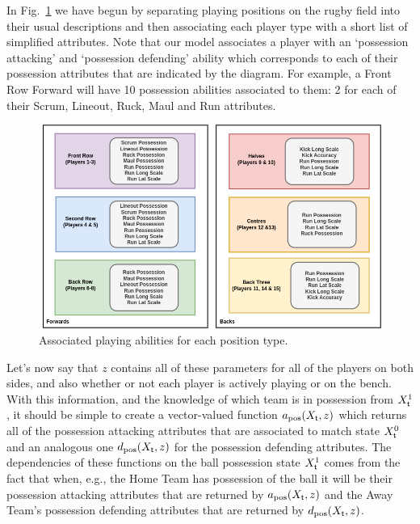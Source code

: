 In Fig.~\ref{fig:player-abilities} we have begun by separating playing positions on the rugby field into their usual descriptions and then associating each player type with a short list of simplified attributes. Note that our model associates a player with an `possession attacking' and `possession defending' ability which corresponds to each of their possession attributes that are indicated by the diagram. For example, a Front Row Forward will have 10 possession abilities associated to them: 2 for each of their {\sf Scrum}, {\sf Lineout}, {\sf Ruck}, {\sf Maul} and {\sf Run} attributes.

\begin{figure}[h]
\includegraphics[width=15cm]{images/rugby-player-abilities.drawio.png}
\caption{Associated playing abilities for each position type.}
\label{fig:player-abilities}
\end{figure}

Let's now say that $z$ contains all of these parameters for all of the players on both sides, and also whether or not each player is actively playing or on the bench. With this information, and the knowledge of which team is in possession from $X^1_{\sf t}$, it should be simple to create a vector-valued function $a_{\rm pos}(X_{\sf t}, z)$ which returns all of the possession attacking attributes that are associated to match state $X^0_{\sf t}$ and an analogous one $d_{\rm pos}(X_{\sf t}, z)$ for the possession defending attributes. The dependencies of these functions on the ball possession state $X^1_{\sf t}$ comes from the fact that when, e.g., the {\sf Home Team} has possession of the ball it will be their possession attacking attributes that are returned by $a_{\rm pos}(X_{\sf t}, z)$ and the {\sf Away Team}'s possession defending attributes that are returned by $d_{\rm pos}(X_{\sf t}, z)$.

